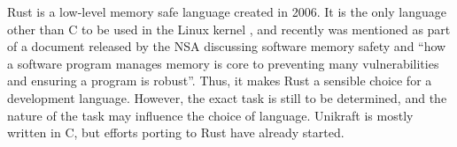 \documentclass{article}
\begin{document}
\noindent Rust is a low-level memory safe language created in 2006.
It is the only language other than C to be used in the Linux kernel \cite{rust-linux}, and recently was mentioned as part of a document released by the NSA \cite{nsa2022memory} discussing software memory safety and ``how a software program manages memory is core to preventing many vulnerabilities and ensuring a program is robust''. Thus, it makes Rust a sensible choice for a development language. However, the exact task is still to be determined, and the nature of the task may influence the choice of language. Unikraft is mostly written in C, but efforts porting to Rust have already started.




\end{document}
